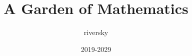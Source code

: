 \documentclass{ctexbook}
\title{A Garden of Mathematics}
\author{riversky}
\date{2019-2029}
\begin{document}
{\let \cleardoublepage \relax \maketitle}





% 



% 
% 
% 
% 
% 
% 
% 
\end{document}
